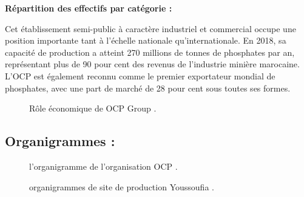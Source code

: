 \documentclass[a4paper,12pt]{report}
\begin{document}
\textbf{Répartition des effectifs par catégorie :}

Cet établissement semi-public à caractère industriel et commercial occupe une position importante tant à l'échelle nationale qu'internationale. En 2018, sa capacité de production a atteint 270 millions de tonnes de phosphates par an, représentant plus de 90 pour cent  des revenus de l'industrie minière marocaine. L'OCP est également reconnu comme le premier exportateur mondial de phosphates, avec une part de marché de 28 pour cent sous toutes ses formes.
\begin{figure}[h]
    \centering
    \caption{Rôle économique de OCP Group .}
    \label{fig:mon_image}
\end{figure}


\newpage



\subsection{Organigrammes :}
\begin{figure}[h]
    \centering
    \caption{l'organigramme de l'organisation OCP .}
    \label{fig:mon_image}
\end{figure}

\begin{figure}[h]
    \centering
    \caption{organigrammes de site de production Youssoufia .}
    \label{fig:mon_image}
\end{figure}
\newpage
\end{document}
